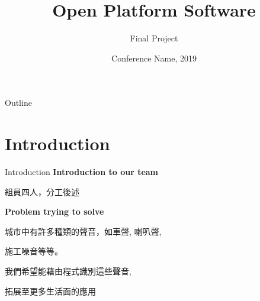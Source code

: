\documentclass{beamer}
\title{Open Platform Software}
\subtitle{Final Project}
\institute[Yuan Ze University] %
{
  \inst{1}%
  Department of Computer Science\\
  University of Somewhere
}
\date{Conference Name, 2019}
\begin{document}
\begin{CJK}{UTF8}{bsmi}
\begin{frame}
  \titlepage
\end{frame}

\begin{frame}{Outline}
  \tableofcontents
\end{frame}

\section{Introduction}

\begin{frame}{Introduction}
\textbf{Introduction to our team }
 \vspace{0.5cm}
\begin{description}
\item 組員四人，分工後述
 \vspace{0.5cm}
\end{description}
\textbf{Problem trying to solve  }
\begin{description}
 \vspace{0.5cm}
\item 城市中有許多種類的聲音，如車聲, 喇叭聲, 
\item 施工噪音等等。
\item 我們希望能藉由程式識別這些聲音,
\item 拓展至更多生活面的應用
\end{description}
\end{frame}


\end{CJK}
\end{document}
